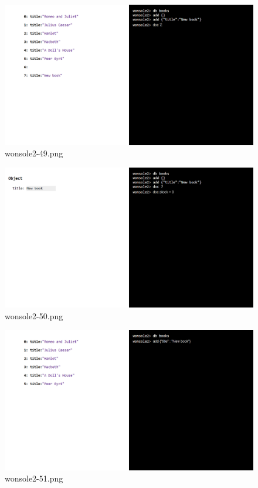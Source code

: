 \clearpage
\begin{figure}
\includegraphics[width=\textwidth]{screenshot/wonsole2/wonsole2-49.png}
\caption{wonsole2-49.png}
\label{wonsole2-49.png}
\end{figure}


\begin{figure}
\includegraphics[width=\textwidth]{screenshot/wonsole2/wonsole2-50.png}
\caption{wonsole2-50.png}
\label{wonsole2-50.png}
\end{figure}


\clearpage
\begin{figure}
\includegraphics[width=\textwidth]{screenshot/wonsole2/wonsole2-51.png}
\caption{wonsole2-51.png}
\label{wonsole2-51.png}
\end{figure}


